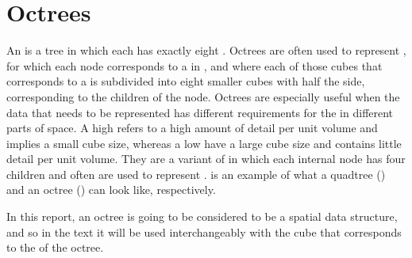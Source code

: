 \chapter{Octrees}
\label{chap:octrees}

An \octree is a tree  in which each  has exactly eight . Octrees are often used to represent , for which each node corresponds to a \cube in , and where each of those cubes that corresponds to a  is subdivided into eight smaller cubes with half the side, corresponding to the children of the node. Octrees are especially useful when the data that needs to be represented has different requirements for the \LOD in different parts of space. A high \LOD refers to a high amount of detail per unit volume and implies a small cube size, whereas a low \LOD have a large cube size and contains little detail per unit volume. They are a variant of \quadtrees in which each internal node has four children and often are used to represent .  is an example of what a quadtree () and an octree () can look like, respectively.

In this report, an octree is going to be considered to be a spatial data structure, and so in the text it will be used interchangeably with the cube that corresponds to the  of the octree.

